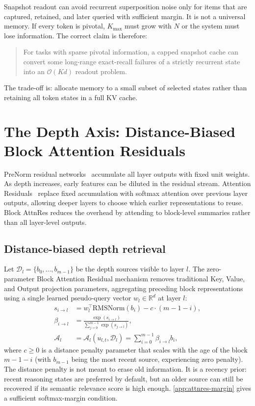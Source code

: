 \documentclass[preprint,12pt]{elsarticle}
\newcommand{\Att}{\mathcal{A}}
\newcommand{\Oh}{\mathcal{O}}
\newcommand{\RMS}{\mathrm{RMSNorm}}
\begin{document}
Snapshot readout can avoid recurrent superposition noise only for items that are captured, retained, and later queried with sufficient margin. It is not a universal memory. If every token is pivotal, $K_{\max}$ must grow with $N$ or the system must lose information. The correct claim is therefore:

\begin{quote}
For tasks with sparse pivotal information, a capped snapshot cache can convert some long-range exact-recall failures of a strictly recurrent state into an $\Oh(Kd)$ readout problem.
\end{quote}

The trade-off is: allocate memory to a small subset of selected states rather than retaining all token states in a full KV cache.

\section{The Depth Axis: Distance-Biased Block Attention Residuals}

PreNorm residual networks~\cite{he2016} accumulate all layer outputs with fixed unit weights. As depth increases, early features can be diluted in the residual stream. Attention Residuals~\cite{attnres} replace fixed accumulation with softmax attention over previous layer outputs, allowing deeper layers to choose which earlier representations to reuse. Block AttnRes reduces the overhead by attending to block-level summaries rather than all layer-level outputs.

\subsection{Distance-biased depth retrieval}

Let $\mathcal{D}_l=\{b_0,\ldots,b_{m-1}\}$ be the depth sources visible to layer $l$. The zero-parameter Block Attention Residual mechanism removes traditional Key, Value, and Output projection parameters, aggregating preceding block representations using a single learned pseudo-query vector $w_l \in \mathbb{R}^d$ at layer $l$:
\begin{align}
\label{eq:attnres-score}
s_{i\to l} &= w_l^\top \RMS(b_i) - c \cdot (m - 1 - i), \\
\beta_{i\to l} &= \frac{\exp(s_{i\to l})}{\sum_{j=0}^{m-1}\exp(s_{j\to l})}, \\
\Att_l &= \Att_l(u_{l,t}, \mathcal{D}_l) = \sum_{i=0}^{m-1} \beta_{i\to l} b_i,
\end{align}
where $c \geq 0$ is a distance penalty parameter that scales with the age of the block $m-1-i$ (with $b_{m-1}$ being the most recent source, experiencing zero penalty).
The distance penalty is not meant to erase old information. It is a recency prior: recent reasoning states are preferred by default, but an older source can still be recovered if its semantic relevance score is high enough. \ref{app:attnres-margin} gives a sufficient softmax-margin condition.
\end{document}
